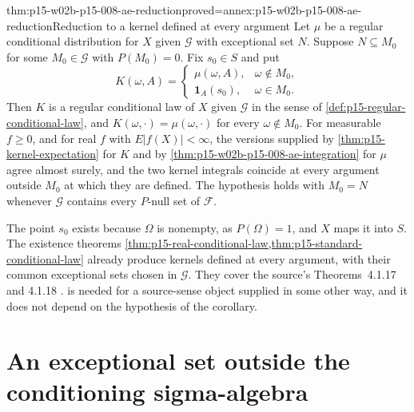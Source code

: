 \begin{hbcorollary}{thm:p15-w02b-p15-008-ae-reduction}{proved=annex:p15-w02b-p15-008-ae-reduction}{Reduction to a kernel defined at every argument}
Let \(\mu\) be a regular conditional distribution for \(X\) given
\(\mathcal G\) with exceptional set \(N\). Suppose \(N\subseteq M_0\) for
some \(M_0\in\mathcal G\) with \(P(M_0)=0\). Fix \(s_0\in S\) and put
\[
 K(\omega,A)=
 \begin{cases}
  \mu(\omega,A),&\omega\notin M_0,\\
  \mathbf1_A(s_0),&\omega\in M_0.
 \end{cases}
\]
Then \(K\) is a regular conditional law of \(X\) given \(\mathcal G\) in the
sense of \cref{def:p15-regular-conditional-law}, and
\(K(\omega,\cdot)=\mu(\omega,\cdot)\) for every \(\omega\notin M_0\).
For measurable \(f\geq0\), and for real \(f\) with \(E|f(X)|<\infty\),
the versions supplied by \cref{thm:p15-kernel-expectation} for \(K\) and by
\cref{thm:p15-w02b-p15-008-ae-integration} for \(\mu\) agree almost surely,
and the two kernel integrals coincide at every argument outside
\(M_0\) at which they are defined.
The hypothesis holds with \(M_0=N\) whenever \(\mathcal G\) contains every
\(P\)-null set of \(\mathcal F\).
\end{hbcorollary}

The point \(s_0\) exists because \(\Omega\) is nonempty, as \(P(\Omega)=1\),
and \(X\) maps it into \(S\). The existence theorems
\cref{thm:p15-real-conditional-law,thm:p15-standard-conditional-law}
already produce kernels defined at every argument, with their common
exceptional sets chosen in \(\mathcal G\). They cover the source's
Theorems~4.1.17 and 4.1.18 \cite[p.~215]{DurrettPTEAuthor2019}.
 is needed for a source-sense
object supplied in some other way, and it does not depend on the
hypothesis of the corollary.

\section{An exceptional set outside the conditioning sigma-algebra}
\label{sec:p15-w02b-p15-008-counterexample}

